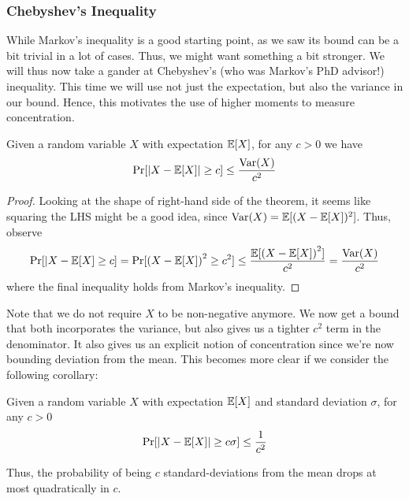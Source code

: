 \subsubsection{Chebyshev's Inequality}
\label{sec:prob:conc:cheby}
While Markov's inequality is a good starting point, as we saw its bound can be a bit trivial
in a lot of cases. Thus, we might want something a bit stronger. We will thus now take a gander
at Chebyshev's (who was Markov's PhD advisor!) inequality. This time we will use not just the
expectation, but also the variance in our bound. Hence, this motivates the use of higher moments
to measure concentration.
\begin{theorem}
    Given a random variable $X$ with expectation $\mathbb{E}[X]$, for any $c > 0$ we have
    \begin{align*}
        \Pr[|X - \mathbb{E}[X]| \geq c] \leq \frac{\mathrm{Var}(X)}{c^2}
    \end{align*}
\end{theorem}
\begin{proof}
    Looking at the shape of right-hand side of the theorem, it seems like squaring the
    LHS might be a good idea, since $\mathrm{Var}(X) = \mathbb{E}[(X - \mathbb{E}[X])^2]$. Thus, observe
    \begin{align*}
        \Pr[|X - \mathbb{E}[X] \geq c] = \Pr[\left( X - \mathbb{E}[X] \right)^2 \geq c^2] \leq \frac{\mathbb{E}[\left( X - \mathbb{E}[X]\right)^2]}{c^2} = \frac{\mathrm{Var}(X)}{c^2}
    \end{align*}
    where the final inequality holds from Markov's inequality.
\end{proof}
Note that we do not require $X$ to be non-negative anymore. We now get a bound that
both incorporates the variance, but also gives us a tighter $c^2$ term in the denominator.
It also gives us an explicit notion of concentration since we're now bounding deviation from
the mean. This becomes more clear if we consider the following corollary:
\begin{corollary}
    Given a random variable $X$ with expectation $\mathbb{E}[X]$ and standard deviation $\sigma$, for any $c > 0$
    \begin{align*}
        \Pr[|X - \mathbb{E}[X]| \geq c\sigma] \leq \frac{1}{c^2}
    \end{align*}
\end{corollary}
Thus, the probability of being $c$ standard-deviations from the mean drops at most quadratically
in $c$.
